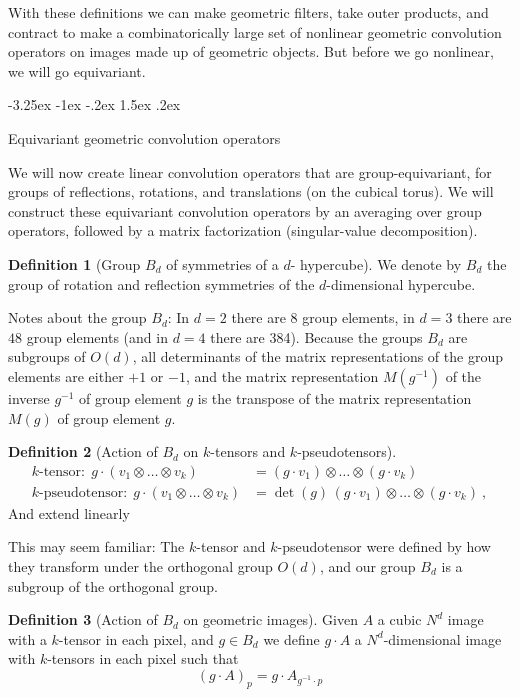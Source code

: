 \documentclass{article}
\makeatletter
\theoremstyle{definition}
\newtheorem{definition}{Definition}
\renewcommand\section{\@startsection {section}{1}{\z@}%
  {-3.25ex \@plus -1ex \@minus -.2ex}%
  {1.5ex \@plus .2ex}%
  {\raggedright\normalfont\large\bfseries}}
\makeatother
\begin{document}
With these definitions we can make geometric filters, take outer products, and contract to make a combinatorically large set of nonlinear geometric convolution operators on images made up of geometric objects.
But before we go nonlinear, we will go equivariant.

\section{Equivariant geometric convolution operators}

We will now create linear convolution operators that are group-equivariant, for groups of reflections, rotations, and translations (on the cubical torus).
We will construct these equivariant convolution operators by an averaging over group operators, followed by a matrix factorization (singular-value decomposition).

\begin{definition}[Group $B_d$ of symmetries of a $d$- hypercube]
We denote by $B_d$ the group of rotation and reflection symmetries of the $d$-dimensional hypercube.
\end{definition}

Notes about the group $B_d$: In $d=2$ there are $8$ group elements, in $d=3$ there are $48$ group elements (and in $d=4$ there are 384). Because the groups $B_d$ are subgroups of $O(d)$, all determinants of the matrix representations of the group elements are either $+1$ or $-1$, and the matrix representation $M(g^{-1})$ of the inverse $g^{-1}$ of group element $g$ is the transpose of the matrix representation $M(g)$ of group element $g$.

\begin{definition}[Action of $B_d$ on $k$-tensors and $k$-pseudotensors]
\begin{align}
\mbox{$k$-tensor:} ~~ g\cdot(v_1 \otimes \ldots \otimes v_k) &= (g\cdot v_1)\otimes\ldots\otimes(g\cdot v_k) \\
\mbox{$k$-pseudotensor:} ~~ g\cdot(v_1 \otimes \ldots \otimes v_k) &= \det(g)\,(g\cdot v_1)\otimes\ldots\otimes(g\cdot v_k) ~,
\end{align}
And extend linearly
\end{definition}

This may seem familiar: The $k$-tensor and $k$-pseudotensor were defined by how they transform under the orthogonal group $O(d)$, and our group $B_d$ is a subgroup of the orthogonal group.

\begin{definition}[Action of $B_d$ on geometric images]
Given $A$ a cubic $N^d$ image with a $k$-tensor in each pixel, and $g\in B_d$ we define $g\cdot A$ a $N^d$-dimensional image with $k$-tensors in each pixel such that
\begin{equation}
    (g\cdot A)_p = g\cdot A_{g^{-1}\cdot p}
\end{equation}
\end{definition}
\end{document}
